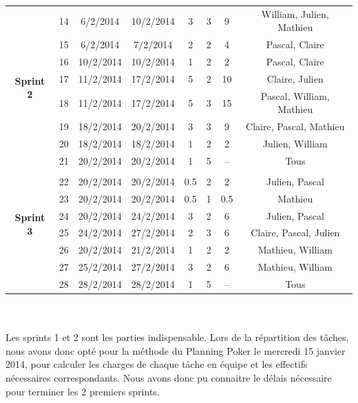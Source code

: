 \documentclass[a4paper,11pt,french]{article}
\begin{document}
\begin{tabular}{|c|c|c|c|c|c|c|c|}
\hline
&&&&&&&\\
\hline
\multirow{8}{*}{\begin{sideways}\textbf{Sprint 2}\end{sideways}}
&14 		& 6/2/2014 		& 10/2/2014 		& 3		& 3 		& 9			& William, Julien, Mathieu\\
\cline{2-8}
&15 		& 6/2/2014 		& 7/2/2014 			& 2 	& 2 		& 4			& Pascal, Claire\\
\cline{2-8}
&16 		& 10/2/2014 	& 10/2/2014 		& 1 	& 2 		& 2			& Pascal, Claire\\
\cline{2-8}
&17 		& 11/2/2014 	& 17/2/2014 		& 5 	& 2 		& 10		& Claire, Julien\\
\cline{2-8}
&18 		& 11/2/2014 	& 17/2/2014 		& 5 	& 3 		& 15		& Pascal, William, Mathieu\\
\cline{2-8}
&19 		& 18/2/2014 	& 20/2/2014 		& 3 	& 3 		& 9			& Claire, Pascal, Mathieu\\
\cline{2-8}
&20 		& 18/2/2014 	& 18/2/2014 		& 1 	& 2 		& 2			& Julien, William\\
\cline{2-8}
&21 		& 20/2/2014 	& 20/2/2014 		& 1 	& 5 		& --		& Tous\\
\hline
&&&&&&&\\
\hline
\multirow{6}{*}{\begin{sideways}\textbf{Sprint 3}\end{sideways}}
&22 		& 20/2/2014 	& 20/2/2014 		& 0.5 	& 2 		& 2			& Julien, Pascal\\
\cline{2-8}
&23 		& 20/2/2014 	& 20/2/2014 		& 0.5 	& 1 		& 0.5 		& Mathieu\\
\cline{2-8}
&24 		& 20/2/2014 	& 24/2/2014 		& 3 	& 2 		& 6			& Julien, Pascal\\
\cline{2-8}
&25 		& 24/2/2014 	& 27/2/2014 		& 2 	& 3 		& 6			& Claire, Pascal, Julien\\
\cline{2-8}
&26 		& 20/2/2014 	& 21/2/2014 		& 1 	& 2 		& 2			& Mathieu, William\\
\cline{2-8}
&27 		& 25/2/2014 	& 27/2/2014 		& 3 	& 2 		& 6			& Mathieu, William\\
\cline{2-8}
&28 		& 28/2/2014 	& 28/2/2014 		& 1 	& 5 		& --			& Tous\\
\hline
\end{tabular}
\\ \\

Les sprints 1 et 2 sont les parties indispensable. Lors de la répartition des tâches, nous avons donc opté pour la méthode du Planning Poker le mercredi 15 janvier 2014, pour calculer les charges de chaque tâche en équipe et les effectifs nécessaires correspondants. Nous avons donc pu connaitre le délais nécessaire pour terminer les 2 premiers sprints.
\\
\end{document}
